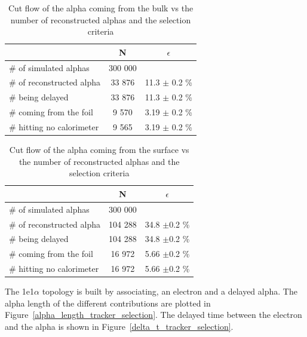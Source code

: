 \documentclass[main.tex]{subfiles}
\begin{document}
\begin{table}[h!]
\begin{center}
\begin{tabular}{l|c|c}
 & N & $\epsilon$ \\
\toprule
$\#$ of simulated alphas & 300 000 & \\
\hline
$\#$ of reconstructed alpha & 33 876 & 11.3 $\pm$ 0.2 \%\\
$\#$ being delayed          & 33 876 & 11.3 $\pm$ 0.2 \%\\
$\#$ coming from the foil   & 9 570  & 3.19 $\pm$ 0.2 \%\\
$\#$ hitting no calorimeter & 9 565  & 3.19 $\pm$ 0.2 \%\\
\bottomrule
\end{tabular}
\end{center}
\caption{Cut flow of the alpha coming from the bulk vs the number of reconstructed alphas and the selection criteria}
\label{Cutflowalphatrackerbulk}
\end{table}


\begin{table}[h!]
\begin{center}
\begin{tabular}{l|c|c}
 & N & $\epsilon$ \\
\toprule
$\#$ of simulated alphas & 300 000 & \\
\hline
$\#$ of reconstructed alpha & 104 288 & 34.8 $\pm $0.2 \%\\
$\#$ being delayed          & 104 288 & 34.8 $\pm $0.2 \%\\
$\#$ coming from the foil   & 16 972  & 5.66 $\pm $0.2 \%\\
$\#$ hitting no calorimeter & 16 972  & 5.66 $\pm $0.2 \%\\
\bottomrule
\end{tabular}
\end{center}
\caption{Cut flow of the alpha coming from the surface vs the number of reconstructed alphas and the selection criteria}
\label{Cutflowalphatrackersurface}
\end{table}


\bigskip


\noindent The 1e1$\alpha$ topology is built by associating, an electron and a delayed alpha. The alpha length of the different contributions are plotted in Figure~\ref{alpha_length_tracker_selection}. The delayed time between the electron and the alpha is shown in Figure~\ref{delta_t_tracker_selection}.
\end{document}

